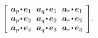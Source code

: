 \begin{otherlanguage}{russian}
\[\scalebox{0.92}[0.92]{$\left[\hspace{-0.2ex}\begin{array}{c@{\hspace{0.64em}}c@{\hspace{0.64em}}c}
\bm{a}_p \narrowdotp\hspace{0.12ex} \bm{e}_1 & \bm{a}_q \narrowdotp\hspace{0.12ex} \bm{e}_1 & \bm{a}_r \narrowdotp\hspace{0.12ex} \bm{e}_1 \\
\bm{a}_p \narrowdotp\hspace{0.12ex} \bm{e}_2 & \bm{a}_q \narrowdotp\hspace{0.12ex} \bm{e}_2 & \bm{a}_r \narrowdotp\hspace{0.12ex} \bm{e}_2 \\
\bm{a}_p \narrowdotp\hspace{0.12ex} \bm{e}_3 & \bm{a}_q \narrowdotp\hspace{0.12ex} \bm{e}_3 & \bm{a}_r \narrowdotp\hspace{0.12ex} \bm{e}_3
\end{array}\hspace{-0.12ex}\right]$} .
\]


\end{otherlanguage}
